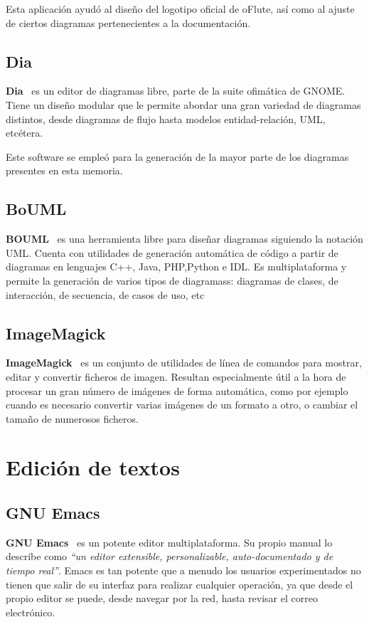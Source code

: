 Esta aplicación ayudó al diseño del logotipo oficial de oFlute, así como al
ajuste de ciertos diagramas pertenecientes a la documentación.

\subsection{Dia}
\textbf{Dia}~\cite{dia} es un editor de diagramas libre, parte de la suite ofimática de
GNOME. Tiene un diseño modular que le permite abordar una gran variedad de
diagramas distintos, desde diagramas de flujo hasta modelos entidad-relación,
UML, etcétera.

Este software se empleó para la generación de la mayor parte de los diagramas
presentes en esta memoria.

\subsection{BoUML}

\textbf{BOUML}~\cite{bouml} es una herramienta libre para diseñar diagramas siguiendo la
notación UML. Cuenta con utilidades de generación automática de código a partir
de diagramas en lenguajes C++, Java, PHP,Python e IDL. Es multiplataforma y
permite la generación de varios tipos de diagramass: diagramas de clases, de
interacción, de secuencia, de casos de uso, etc

\subsection{ImageMagick}

\textbf{ImageMagick}~\cite{imagemagick} es un conjunto de utilidades de línea de comandos para
mostrar, editar y convertir ficheros de imagen. Resultan especialmente útil a la
hora de procesar un gran número de imágenes de forma automática, como por
ejemplo cuando es necesario convertir varias imágenes de un formato a otro, o
cambiar el tamaño de numerosos ficheros.

\section{Edición de textos}

\subsection{GNU Emacs}
\textbf{GNU Emacs}~\cite{refemacs} es un potente editor multiplataforma. Su propio manual lo
describe como \textit{``un editor extensible, personalizable, auto-documentado y
  de tiempo real''}. Emacs es tan potente que a menudo los usuarios
experimentados no tienen que salir de su interfaz para realizar cualquier
operación, ya que desde el propio editor se puede, desde navegar por la red,
hasta revisar el correo electrónico.


